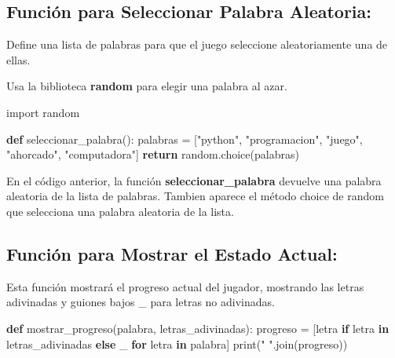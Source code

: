\documentclass[
  a4paper,
  DIV=11,
  numbers=noendperiod,
  onepage,
  openany]{scrreprt}
\newenvironment{Shaded}{\begin{snugshade}}{\end{snugshade}}
\newcommand{\BuiltInTok}[1]{\textcolor[rgb]{0.00,0.23,0.31}{#1}}
\newcommand{\ControlFlowTok}[1]{\textcolor[rgb]{0.00,0.23,0.31}{\textbf{#1}}}
\newcommand{\ImportTok}[1]{\textcolor[rgb]{0.00,0.46,0.62}{#1}}
\newcommand{\KeywordTok}[1]{\textcolor[rgb]{0.00,0.23,0.31}{\textbf{#1}}}
\newcommand{\NormalTok}[1]{\textcolor[rgb]{0.00,0.23,0.31}{#1}}
\newcommand{\OperatorTok}[1]{\textcolor[rgb]{0.37,0.37,0.37}{#1}}
\newcommand{\StringTok}[1]{\textcolor[rgb]{0.13,0.47,0.30}{#1}}
\begin{document}
\subsection{Función para Seleccionar Palabra
Aleatoria:}\label{funciuxf3n-para-seleccionar-palabra-aleatoria}

Define una lista de palabras para que el juego seleccione aleatoriamente
una de ellas.

Usa la biblioteca \textbf{random} para elegir una palabra al azar.

\begin{Shaded}
\begin{Highlighting}[]
\ImportTok{import}\NormalTok{ random}

\KeywordTok{def}\NormalTok{ seleccionar\_palabra():}
\NormalTok{    palabras }\OperatorTok{=}\NormalTok{ [}\StringTok{"python"}\NormalTok{, }\StringTok{"programacion"}\NormalTok{, }\StringTok{"juego"}\NormalTok{, }\StringTok{"ahorcado"}\NormalTok{, }\StringTok{"computadora"}\NormalTok{]}
    \ControlFlowTok{return}\NormalTok{ random.choice(palabras)}
\end{Highlighting}
\end{Shaded}

En el código anterior, la función \textbf{seleccionar\_palabra} devuelve
una palabra aleatoria de la lista de palabras. Tambien aparece el método
choice de random que selecciona una palabra aleatoria de la lista.

\subsection{Función para Mostrar el Estado
Actual:}\label{funciuxf3n-para-mostrar-el-estado-actual}

Esta función mostrará el progreso actual del jugador, mostrando las
letras adivinadas y guiones bajos \_ para letras no adivinadas.

\begin{Shaded}
\begin{Highlighting}[]
\KeywordTok{def}\NormalTok{ mostrar\_progreso(palabra, letras\_adivinadas):}
\NormalTok{    progreso }\OperatorTok{=}\NormalTok{ [letra }\ControlFlowTok{if}\NormalTok{ letra }\KeywordTok{in}\NormalTok{ letras\_adivinadas }\ControlFlowTok{else} \StringTok{\textquotesingle{}\_\textquotesingle{}} \ControlFlowTok{for}\NormalTok{ letra }\KeywordTok{in}\NormalTok{ palabra]}
    \BuiltInTok{print}\NormalTok{(}\StringTok{" "}\NormalTok{.join(progreso))}
\end{Highlighting}
\end{Shaded}
\end{document}
